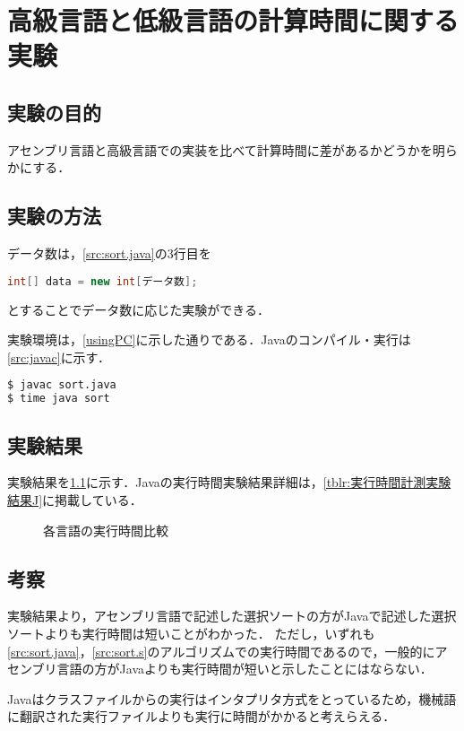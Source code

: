 \chapter{高級言語と低級言語の計算時間に関する実験}\label{chap4}
\section{実験の目的}
アセンブリ言語と高級言語での実装を比べて計算時間に差があるかどうかを明らかにする．
\section{実験の方法}
データ数は，\ref{src:sort.java}の3行目を
\begin{lstlisting}[caption={}, label={}, language={Java}, frame={none},numbers={none}]
int[] data = new int[データ数];
\end{lstlisting}
とすることでデータ数に応じた実験ができる．\par
実験環境は，\ref{usingPC}に示した通りである．{\ttfamily Java}のコンパイル・実行は\ref{src:javac}に示す．
\begin{lstlisting}[caption={{\ttfamily Java}コンパイル・実行時間の計測}, label={src:javac}, language={Bash},frame={single},numbers={none}]
$ javac sort.java
$ time java sort
\end{lstlisting}
\section{実験結果}
実験結果を\ref{fig:比較}に示す．{\ttfamily Java}の実行時間実験結果詳細は，\ref{tblr:実行時間計測実験結果J}に掲載している．
\begin{figure}[htb]
    \centering
    \caption{各言語の実行時間比較}
    \label{fig:比較}
\end{figure}
\section{考察}
実験結果より，アセンブリ言語で記述した選択ソートの方が{\ttfamily Java}で記述した選択ソートよりも実行時間は短いことがわかった．
ただし，いずれも\ref{src:sort.java}，\ref{src:sort.s}のアルゴリズムでの実行時間であるので，一般的にアセンブリ言語の方が{\ttfamily Java}よりも実行時間が短いと示したことにはならない．\par
{\ttfamily Java}はクラスファイルからの実行はインタプリタ方式をとっているため，機械語に翻訳された実行ファイルよりも実行に時間がかかると考えらえる．